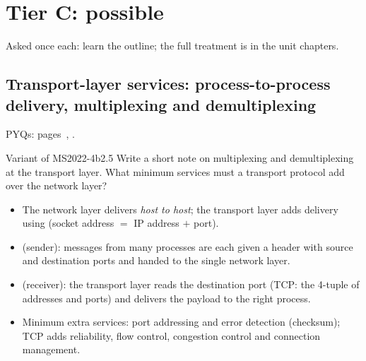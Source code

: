 \section{Tier C: possible}
Asked once each: learn the outline; the full treatment is in the unit chapters.

\subsection{Transport-layer services: process-to-process delivery, multiplexing and demultiplexing}\label{iq:C20}
     \quad PYQs: pages~\pageref{q:MS2022-1b}, \pageref{q:MS2022-4b}.
\begin{question}{Variant of MS2022-4b}{2.5}
Write a short note on multiplexing and demultiplexing at the transport layer. What minimum services must a transport protocol add over the network layer?
\end{question}
\begin{solution}[outline]
\begin{itemize}
\item The network layer delivers \emph{host to host}; the transport layer adds  delivery using  (socket address $=$ IP address $+$ port).
\item {} (sender): messages from many processes are each given a header with source and destination ports and handed to the single network layer.
\item {} (receiver): the transport layer reads the destination port (TCP: the 4-tuple of addresses and ports) and delivers the payload to the right process.
\item Minimum extra services: port addressing and error detection (checksum); TCP adds reliability, flow control, congestion control and connection management.
\end{itemize}
\end{solution}
